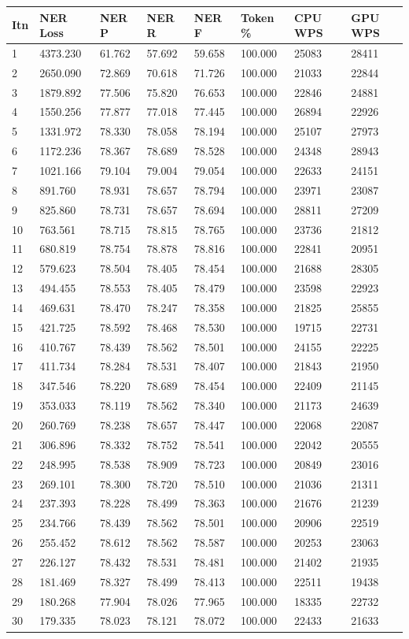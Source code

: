 \documentclass[12pt,a4paper,]{scrartcl}
\begin{document}
\begin{longtable}[]{@{}llllllll@{}}
\toprule
Itn & NER Loss & NER P & NER R & NER F & Token \% & CPU WPS & GPU WPS\tabularnewline
\midrule
\endhead
1 & 4373.230 & 61.762 & 57.692 & 59.658 & 100.000 & 25083 & 28411\tabularnewline
2 & 2650.090 & 72.869 & 70.618 & 71.726 & 100.000 & 21033 & 22844\tabularnewline
3 & 1879.892 & 77.506 & 75.820 & 76.653 & 100.000 & 22846 & 24881\tabularnewline
4 & 1550.256 & 77.877 & 77.018 & 77.445 & 100.000 & 26894 & 22926\tabularnewline
5 & 1331.972 & 78.330 & 78.058 & 78.194 & 100.000 & 25107 & 27973\tabularnewline
6 & 1172.236 & 78.367 & 78.689 & 78.528 & 100.000 & 24348 & 28943\tabularnewline
7 & 1021.166 & 79.104 & 79.004 & 79.054 & 100.000 & 22633 & 24151\tabularnewline
8 & 891.760 & 78.931 & 78.657 & 78.794 & 100.000 & 23971 & 23087\tabularnewline
9 & 825.860 & 78.731 & 78.657 & 78.694 & 100.000 & 28811 & 27209\tabularnewline
10 & 763.561 & 78.715 & 78.815 & 78.765 & 100.000 & 23736 & 21812\tabularnewline
11 & 680.819 & 78.754 & 78.878 & 78.816 & 100.000 & 22841 & 20951\tabularnewline
12 & 579.623 & 78.504 & 78.405 & 78.454 & 100.000 & 21688 & 28305\tabularnewline
13 & 494.455 & 78.553 & 78.405 & 78.479 & 100.000 & 23598 & 22923\tabularnewline
14 & 469.631 & 78.470 & 78.247 & 78.358 & 100.000 & 21825 & 25855\tabularnewline
15 & 421.725 & 78.592 & 78.468 & 78.530 & 100.000 & 19715 & 22731\tabularnewline
16 & 410.767 & 78.439 & 78.562 & 78.501 & 100.000 & 24155 & 22225\tabularnewline
17 & 411.734 & 78.284 & 78.531 & 78.407 & 100.000 & 21843 & 21950\tabularnewline
18 & 347.546 & 78.220 & 78.689 & 78.454 & 100.000 & 22409 & 21145\tabularnewline
19 & 353.033 & 78.119 & 78.562 & 78.340 & 100.000 & 21173 & 24639\tabularnewline
20 & 260.769 & 78.238 & 78.657 & 78.447 & 100.000 & 22068 & 22087\tabularnewline
21 & 306.896 & 78.332 & 78.752 & 78.541 & 100.000 & 22042 & 20555\tabularnewline
22 & 248.995 & 78.538 & 78.909 & 78.723 & 100.000 & 20849 & 23016\tabularnewline
23 & 269.101 & 78.300 & 78.720 & 78.510 & 100.000 & 21036 & 21311\tabularnewline
24 & 237.393 & 78.228 & 78.499 & 78.363 & 100.000 & 21676 & 21239\tabularnewline
25 & 234.766 & 78.439 & 78.562 & 78.501 & 100.000 & 20906 & 22519\tabularnewline
26 & 255.452 & 78.612 & 78.562 & 78.587 & 100.000 & 20253 & 23063\tabularnewline
27 & 226.127 & 78.432 & 78.531 & 78.481 & 100.000 & 21402 & 21935\tabularnewline
28 & 181.469 & 78.327 & 78.499 & 78.413 & 100.000 & 22511 & 19438\tabularnewline
29 & 180.268 & 77.904 & 78.026 & 77.965 & 100.000 & 18335 & 22732\tabularnewline
30 & 179.335 & 78.023 & 78.121 & 78.072 & 100.000 & 22433 & 21633\tabularnewline
\bottomrule
\end{longtable}
\end{document}
